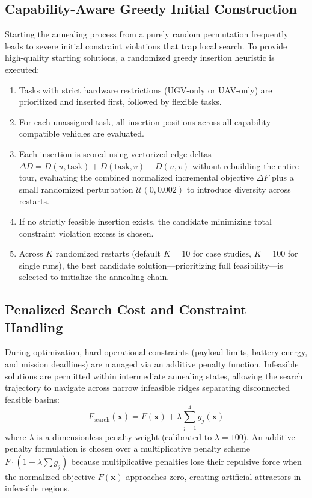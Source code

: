 \subsection{Capability-Aware Greedy Initial Construction}
Starting the annealing process from a purely random permutation frequently leads to severe initial constraint violations that trap local search. To provide high-quality starting solutions, a randomized greedy insertion heuristic is executed:
\begin{enumerate}
    \item Tasks with strict hardware restrictions (UGV-only or UAV-only) are prioritized and inserted first, followed by flexible tasks.
    \item For each unassigned task, all insertion positions across all capability-compatible vehicles are evaluated.
    \item Each insertion is scored using vectorized edge deltas $\Delta D = D(u, \text{task}) + D(\text{task}, v) - D(u, v)$ without rebuilding the entire tour, evaluating the combined normalized incremental objective $\Delta F$ plus a small randomized perturbation $\mathcal{U}(0, 0.002)$ to introduce diversity across restarts.
    \item If no strictly feasible insertion exists, the candidate minimizing total constraint violation excess is chosen.
    \item Across $K$ randomized restarts (default $K = 10$ for case studies, $K = 100$ for single runs), the best candidate solution---prioritizing full feasibility---is selected to initialize the annealing chain.
\end{enumerate}

\subsection{Penalized Search Cost and Constraint Handling}
During optimization, hard operational constraints (payload limits, battery energy, and mission deadlines) are managed via an additive penalty function. Infeasible solutions are permitted within intermediate annealing states, allowing the search trajectory to navigate across narrow infeasible ridges separating disconnected feasible basins:
\begin{equation}\label{eq:sa_fitness}
    F_{\text{search}}(\mathbf{x}) = F(\mathbf{x}) + \lambda \sum_{j=1}^{4} g_j(\mathbf{x})
\end{equation}
where $\lambda$ is a dimensionless penalty weight (calibrated to $\lambda = 100$). An additive penalty formulation is chosen over a multiplicative penalty scheme $F \cdot (1 + \lambda \sum g_j)$ because multiplicative penalties lose their repulsive force when the normalized objective $F(\mathbf{x})$ approaches zero, creating artificial attractors in infeasible regions.

